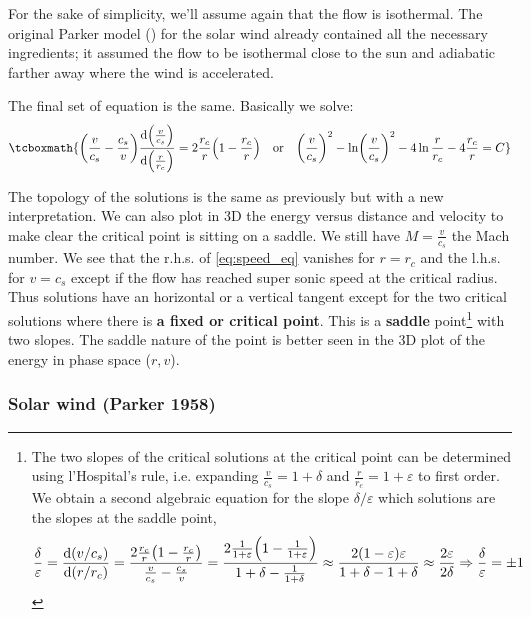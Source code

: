 \documentclass[10pt,a4paper,english]{article}
\let\originalleft\left
\let\originalright\right
\renewcommand{\left}{\mathopen{}\mathclose\bgroup\originalleft}
\renewcommand{\right}{\aftergroup\egroup\originalright}
\begin{document}
For the sake of simplicity, we'll assume again that the flow is isothermal. The
original Parker model (\cite{1958ApJ...128..664P}) for the solar wind already
contained all the necessary ingredients; it assumed the flow to be isothermal
close to the sun and adiabatic farther away where the wind is accelerated.

The final set of equation is the same. Basically we solve:
\begin{equation}
    \tcboxmath{
        \left( \frac{v}{c_s} - \frac{c_s}{v} \right) \frac{\d \left( \frac{v}{c_s} \right) }{\d \left( \frac{r}{r_c } \right) } = 2 \frac{r_c}{r} \left( 1 - \frac{r_c }{r} \right)\quad \textrm{or} \quad
        \left( \frac{v}{c_s} \right)^2 - \ln \left( \frac{v}{c_s} \right)^2 - 4\ln \frac{r}{r_c }- 4 \frac{r_c}{r} = C
    }
\end{equation}

The topology of the solutions is the same as previously but with a new
interpretation. We can also plot in 3D the energy versus distance and velocity
to make clear the critical point is sitting on a saddle. We still have $M =
\frac{v}{c_s}$ the Mach number. We see that the r.h.s. of \eqref{eq:speed_eq}
vanishes for $r=r_c$ and the l.h.s. for $v=c_s$ except if the flow has reached
super sonic speed at the critical radius. Thus solutions have an horizontal or
a vertical tangent except for the two critical solutions where there is
\textbf{a fixed or critical point}. This is a \textbf{saddle}
point\footnote{The two slopes of the critical solutions at the critical point
can be determined using l'Hospital's rule, i.e. expanding $\frac{v}{c_s} = 1 +
\delta$ and $\frac{r}{r_c} = 1 + \varepsilon$ to first order. We obtain a
second algebraic equation for the slope $\delta/\varepsilon$ which solutions
are the slopes at the saddle point,
\begin{equation*}
        \frac{\delta}{\varepsilon} = \frac{\d (v/c_s)}{\d (r/r_c)} = \frac{2 \frac{r_c }{r}\left( 1 - \frac{r_c }{r} \right) }{\frac{v}{c_s} - \frac{c_s}{v}} = \frac{2 \frac{1}{1+\varepsilon} \left( 1 - \frac{1}{1+\varepsilon} \right) }{1 + \delta - \frac{1}{1+\delta}} \approx \frac{2(1-\varepsilon)\varepsilon}{1 + \delta - 1 + \delta} \approx \frac{2\varepsilon}{2\delta} \Rightarrow \frac{\delta}{\varepsilon} = \pm 1
\end{equation*}} with two slopes. The saddle nature of the point is better seen
in the 3D plot of the energy in phase space ($r, v$).

\subsubsection{Solar wind (Parker 1958)}
\end{document}
